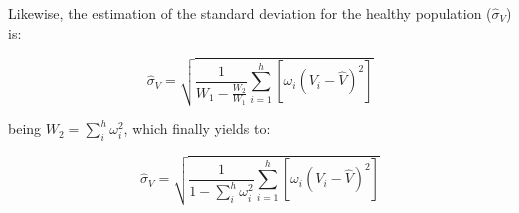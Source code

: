 Likewise, the estimation of the standard deviation for the healthy population ($\widehat{\sigma}_V$) is:
\begin{linenomath}
$$\widehat{\sigma}_V = \sqrt{\frac{1}{W_1-\frac{W_2}{W_1}}\sum_{i=1}^h\left[\omega_i\left(V_i-\hat{V}\right)^2\right]}$$
\end{linenomath}
being $W_2=\sum_i^h \omega_i^2$, which finally yields to:
\begin{linenomath}
$$\widehat{\sigma}_V = \sqrt{\frac{1}{1-\sum_i^h \omega_i^2}\sum_{i=1}^h\left[\omega_i\left(V_i-\hat{V}\right)^2\right]}$$
\end{linenomath}
